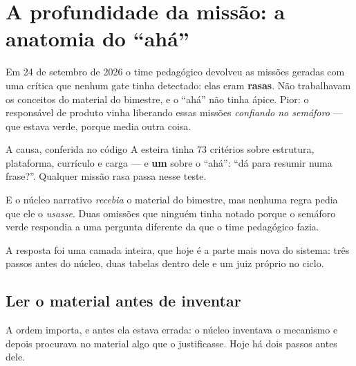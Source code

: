\documentclass[11pt,a4paper]{article}
\begin{document}
\section{A profundidade da missão: a anatomia do ``ahá''}
\label{sec:profundidade}

Em 24 de setembro de 2026 o time pedagógico devolveu as missões geradas com uma crítica que nenhum gate tinha detectado: elas eram \textbf{rasas}. Não trabalhavam os conceitos do material do bimestre, e o ``ahá'' não tinha ápice. Pior: o responsável de produto vinha liberando essas missões \emph{confiando no semáforo} --- que estava verde, porque media outra coisa.

\begin{caixaGuardrail}{A causa, conferida no código}
A esteira tinha 73 critérios sobre estrutura, plataforma, currículo e carga --- e \textbf{um} sobre o ``ahá'': ``dá para resumir numa frase?''. Qualquer missão rasa passa nesse teste.

E o núcleo narrativo \emph{recebia} o material do bimestre, mas nenhuma regra pedia que ele o \emph{usasse}. Duas omissões que ninguém tinha notado porque o semáforo verde respondia a uma pergunta diferente da que o time pedagógico fazia.
\end{caixaGuardrail}

A resposta foi uma camada inteira, que hoje é a parte mais nova do sistema: três passos antes do núcleo, duas tabelas dentro dele e um juiz próprio no ciclo.

\subsection{Ler o material antes de inventar}

A ordem importa, e antes ela estava errada: o núcleo inventava o mecanismo e depois procurava no material algo que o justificasse. Hoje há dois passos antes dele.
\end{document}
